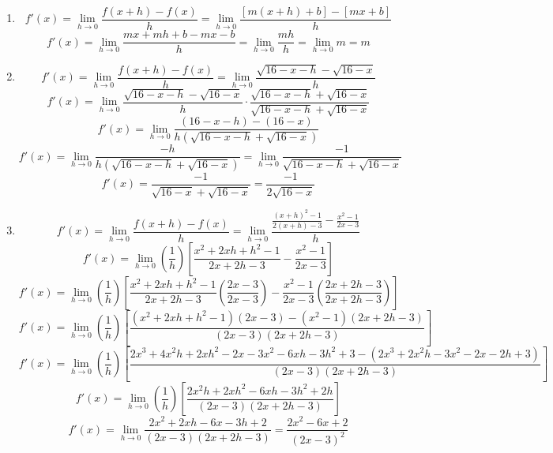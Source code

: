 \begin{Answer}[ref = deriv1]
\begin{enumerate}
    \item $$f'(x) = \lim_{h \to 0} \frac{f(x + h) - f(x)}{h} = \lim_{h \to 0} 
    \frac{\left[ m \left( x + h \right) + b \right] - \left[ mx + b \right]}{
    h}$$
    $$f'(x) = \lim_{h \to 0} \frac{mx + mh + b - mx - b}{h} = \lim_{h \to 0} 
    \frac{mh}{h} = \lim_{h \to 0} m = m$$
    \item $$f'(x) = \lim_{h \to 0} \frac{f(x + h) - f(x)}{h} = \lim_{h \to 0} 
    \frac{\sqrt{16 - x - h} - \sqrt{16 - x}}{h}$$
    $$f'(x) = \lim_{h \to 0} \frac{\sqrt{16 - x - h} - \sqrt{16 - x}}{h} \cdot 
    \frac{\sqrt{16 - x - h} + \sqrt{16 - x}}{\sqrt{16 - x - h} + \sqrt{16 - x}}
    $$
    $$f'(x) = \lim_{h \to 0} \frac{\left( 16 - x - h \right) - \left(16 - x 
    \right)}{h \left( \sqrt{16 - x - h} + \sqrt{16 - x} \right)}$$
    $$f'(x) = \lim_{h \to 0} \frac{-h}{h \left( \sqrt{16 - x - h} + \sqrt{16 - 
    x} \right)} = \lim_{h \to 0} \frac{-1}{\sqrt{16 - x - h} + \sqrt{16 - x}}$$
    $$f'(x) = \frac{-1}{\sqrt{16 - x} + \sqrt{16 - x}} = \frac{-1}{2\sqrt{16 - 
    x}}$$
    \item $$f'(x) = \lim_{h \to 0} \frac{f(x + h) - f(x)}{h} = \lim_{h \to 0} 
    \frac{\frac{(x + h)^2 - 1}{2(x + h) - 3} - \frac{x^2 - 1}{2x - 3}}{h}$$
    $$f'(x) = \lim_{h \to 0} \left( \frac{1}{h} \right) \left[ \frac{x^2 + 2xh 
    + h^2 - 1}{2x + 2h - 3} - \frac{x^2 - 1}{2x - 3} \right]$$
    $$f'(x) = \lim_{h \to 0} \left( \frac{1}{h} \right) \left[ \frac{x^2 + 2xh 
    + h^2 - 1}{2x + 2h - 3} \left( \frac{2x - 3}{2x - 3} \right) - \frac{x^2 - 
    1}{2x - 3} \left( \frac{2x + 2h - 3}{2x + 2h - 3} \right) \right]$$
    $$f'(x) = \lim_{h \to 0} \left( \frac{1}{h} \right) \left[ \frac{\left( 
    x^2 + 2xh + h^2 - 1 \right) \left( 2x - 3 \right) - \left( x^2 - 1 \right) 
    \left( 2x + 2h - 3 \right)}{\left( 2x - 3 \right) \left(2x + 2h - 3 \right)
    } \right]$$
    $$f'(x) = \lim_{h \to 0} \left( \frac{1}{h} \right) \left[ \frac{2x^3 + 4x^2h + 2xh^2 - 
    2x - 3x^2 - 6xh - 3h^2 + 3 - \left( 2x^3 + 2x^2h - 3x^2 - 2x - 2h + 3 
    \right)}{\left( 2x - 3 \right) \left( 2x + 2h - 3 \right)} \right]$$
    $$f'(x) = \lim_{h \to 0} \left( \frac{1}{h} \right) \left[ \frac{2x^2h + 
    2xh^2 - 6xh - 3h^2 + 2h}{\left( 2x - 3 \right) \left( 2x + 2h - 3 \right)} 
    \right]$$
    $$f'(x) = \lim_{h \to 0} \frac{2x^2 + 2xh - 6x - 3h + 2}{\left( 2x - 3 
    \right) \left( 2x + 2h - 3 \right)} = \frac{2x^2 - 6x + 2}{\left( 2x - 3 
    \right)^2}$$
\end{enumerate}
\end{Answer}

